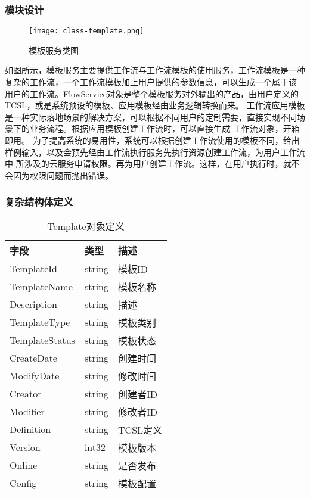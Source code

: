 \subsubsection{模块设计}

\begin{figure}[H]
    \centering
    \texttt{[image: class-template.png]}
    \caption{模板服务类图}
    \label{fig:模板服务类图}
\end{figure}
如图所示，模板服务主要提供工作流与工作流模板的使用服务，工作流模板是一种复杂的工作流，一个工作流模板加上用户提供的参数信息，可以生成一个属于该
用户的工作流。FlowService对象是整个模板服务对外输出的产品，由用户定义的TCSL，或是系统预设的模板、应用模板经由业务逻辑转换而来。
工作流应用模板是一种实际落地场景的解决方案，可以根据不同用户的定制需要，直接实现不同场景下的业务流程。根据应用模板创建工作流时，可以直接生成
工作流对象，开箱即用。
为了提高系统的易用性，系统可以根据创建工作流使用的模板不同，给出样例输入，以及会预先经由工作流执行服务先执行资源创建工作流，为用户工作流中
所涉及的云服务申请权限。再为用户创建工作流。这样，在用户执行时，就不会因为权限问题而抛出错误。




\subsubsection{复杂结构体定义}

\begin{table}[H]
    \centering
    \caption{Template对象定义}
    \label{tab:struct-obj-template}
    \begin{tabular}{lll}
        \toprule
        字段 & 类型 & 描述 \\
        \midrule
        TemplateId & string & 模板ID \\
        TemplateName &        string& 模板名称\\
        Description   &       string& 描述\\
        TemplateType     &    string& 模板类别\\
        TemplateStatus    &   string& 模板状态\\
        CreateDate        &   string& 创建时间\\
        ModifyDate        &   string& 修改时间\\
        Creator           &   string& 创建者ID\\
        Modifier          &   string& 修改者ID\\
        Definition        &   string& TCSL定义\\
        Version           &   int32& 模板版本\\
        Online            &   string& 是否发布\\
        Config            &   string& 模板配置\\
        \bottomrule
    \end{tabular}
\end{table}


